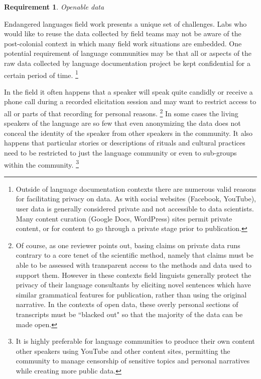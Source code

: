 \documentclass[11pt]{article}
\newtheorem{requirement}{Requirement}
\begin{document}




\begin{requirement}
	\label{req:openable}
       Openable data
\end{requirement}


Endangered languages field work  presents a unique set of
challenges. 
Labs who would like to reuse the data collected by field teams may not be aware of the
post-colonial context in which many field work situations are embedded.
One potential requirement of language communities may be that all or aspects of
the raw data collected by language documentation project be kept confidential for a certain period of time.%
\footnote{Outside of language documentation contexts there are numerous valid reasons for facilitating privacy on data.
As with social websites (Facebook, YouTube), user data is generally considered private and not accessible to data scientists.
Many content curation (Google Docs, WordPress) sites permit private content, or for content to go through a private stage prior to publication.}


In the field it often happens that a speaker will speak quite candidly or
receive a phone call  during a recorded elicitation session and may want to
restrict access to all or parts of that recording for personal reasons.%
\footnote{Of course, as one reviewer points out, basing claims on private data runs contrary to a core
    tenet of the scientific method, namely that claims must be able to be
    assessed with transparent access to the methods and data used to support
    them.  However in these contexts field linguists generally protect the
    privacy of their language consultants by eliciting novel sentences
    which have similar grammatical features for publication, rather than using
the original narrative. In the contexts of open data, these overly personal sections of transcripts must be ``blacked out" so that the majority of the data can be made open.} %
In some cases the living speakers of the language are so few that even
anonymizing the data does not conceal the identity of the speaker from other
speakers in the community.
It also happens that particular stories or descriptions of rituals and cultural
practices need to be restricted to just the language community or even to
sub-groups within the community.%
\footnote{It is highly preferable for language communities to produce
their own content other speakers using YouTube and other content sites, permitting the community
to manage censorship of  sensitive topics and personal narratives while
creating more public data.}
\end{document}
